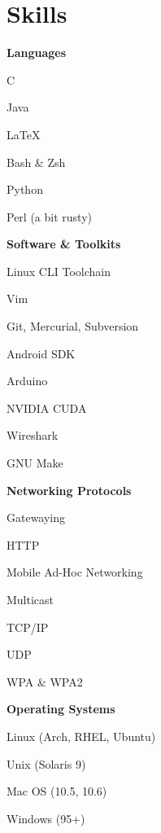 \documentclass[10pt]{barag_resume}
\begin{document}
	\section{Skills}%
		\begin{minipage}[t]{\textwidth}
		\vspace{-1em} %
		\begin{multicols}{2}
			\textbf{Languages}
			\begin{csitemize}
				\item C
				\item Java
				\item \LaTeX
				\item Bash \& Zsh
				\item Python
				\item Perl (a bit rusty)\columnbreak
			\end{csitemize}

			\textbf{Software \& Toolkits}
			\begin{csitemize}
				\item Linux CLI Toolchain
				\item Vim
				\item Git, Mercurial, Subversion
				\item Android SDK
				\item Arduino
				\item NVIDIA CUDA
				\item Wireshark
				\item GNU Make
			\end{csitemize}
		\end{multicols}
		\begin{multicols}{2}
			\textbf{Networking Protocols}
			\begin{csitemize}
				\item Gatewaying
				\item HTTP
				\item Mobile Ad-Hoc Networking
				\item Multicast
				\item TCP/IP
				\item UDP
				\item WPA \& WPA2\columnbreak
			\end{csitemize}

			\textbf{Operating Systems}
			\begin{csitemize}
				\item Linux (Arch, RHEL, Ubuntu)
				\item Unix (Solaris 9)
				\item Mac OS (10.5, 10.6)
				\item Windows (95+)
			\end{csitemize}
		\end{multicols}
		\end{minipage}
\end{document}
